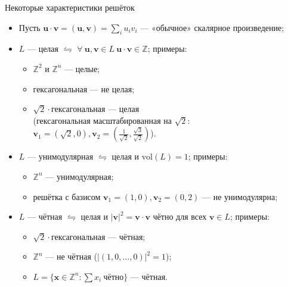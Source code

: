 \documentclass[serif, aspectratio=169]{beamer}
\begin{document}
\begin{frame}{Некоторые характеристики решёток}
    \begin{itemize}
        \item Пусть $\mathbf{u}\cdot \mathbf{v} = (\mathbf{u},\mathbf{v}) = \sum_i u_iv_i$ --- «обычное» скалярное произведение;
        \item $L$ --- целая $\leftrightharpoons$ $\forall\ \mathbf{u}, \mathbf{v} \in L\ \mathbf{u}\cdot \mathbf{v}\in\mathbb{Z}$; примеры: 
        \begin{itemize}
            \item $\mathbb{Z}^2$ и $\mathbb{Z}^n$ --- целые;
            \item гексагональная --- не целая;
            \item $\sqrt2\cdot$гексагональная --- целая\\ (гексагональная масштабированная на $\sqrt2$: $\mathbf{v}_1=(\sqrt2,0), \mathbf{v}_2=(\frac{1}{\sqrt2},\frac{\sqrt3}{\sqrt2})$).
        \end{itemize}
        \item $L$ --- унимодулярная $\leftrightharpoons$ целая и $\mathrm{vol}(L)=1$; примеры:
        \begin{itemize}
            \item $\mathbb{Z}^n$ --- унимодулярная;
            \item решётка с базисом $\mathbf{v}_1=(1,0), \mathbf{v}_2=(0,2)$ --- не унимодулярна;
        \end{itemize}
        \item $L$ --- чётная $\leftrightharpoons$ целая и $|\mathbf{v}|^2=\mathbf{v}\cdot \mathbf{v}$ чётно для всех $\mathbf{v} \in L$; примеры:
        \begin{itemize}
            \item $\sqrt2\cdot$гексагональная --- чётная;
            \item $\mathbb{Z}^n$ --- не чётная ($|(1,0,\dots,0)|^2=1$);
            \item $L=\{\mathbf{x}\in\mathbb{Z}^n: \sum x_i\ \text{чётно}\}$ --- чётная.
        \end{itemize}
    \end{itemize}
\end{frame}
\end{document}
